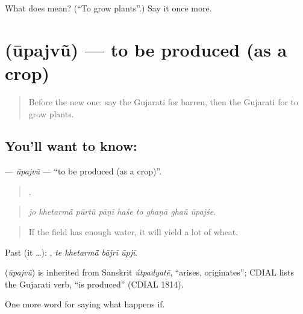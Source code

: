 \begin{tcolorbox}[breakable,colback=teal!4,colframe=teal!35!black,title={Before you move on}]
What does  mean? (\textquotedblleft{}To grow plants\textquotedblright{}.) Say it once more.
\end{tcolorbox}
\section[\texorpdfstring{\gu{ઊપજવું} (ūpajvũ)}{ઊપજવું (ūpajvũ)}]{ (ūpajvũ) — to be produced (as a crop)}

\label{lesson:GU-C390-upajvu}



\begin{quote}
Before the new one: say the Gujarati for barren, then the Gujarati for to grow plants.
\end{quote}

\subsection*{You'll want to know: }
\textbf{} — \emph{ūpajvũ} — \textquotedblleft{}to be produced (as a crop)\textquotedblright{}.

\begin{quote}
        .
\end{quote}

\begin{quote}
\emph{jo khetarmā̃ pūrtũ pāṇī haśe to ghaṇā ghaũ ūpajśe.}
\end{quote}

\begin{quote}
If the field has enough water, it will yield a lot of wheat.
\end{quote}

Past (it …):    , \emph{te khetarmā̃ bājrī ūpjī}.

\begin{cousinweb}
\textbf{} (\emph{ūpajvũ}) is inherited from Sanskrit \emph{útpadyatē}, \textquotedblleft{}arises, originates\textquotedblright{}; CDIAL lists the Gujarati verb, \textquotedblleft{}is produced\textquotedblright{} (CDIAL 1814).
\end{cousinweb}

\begin{grammarlens}[title={What you've built}]
One more word for saying what happens if.
\end{grammarlens}

